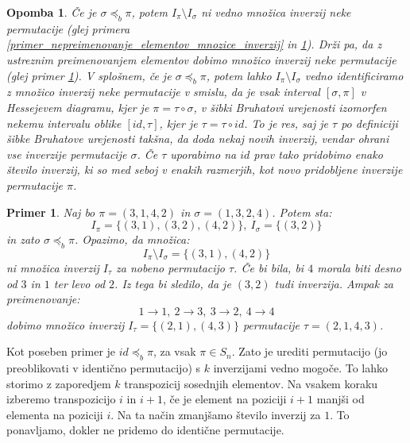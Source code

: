 \documentclass[a4paper, 12pt]{book}
\newtheorem{primer}{Primer}[chapter]
\newtheorem{opomba}{Opomba}[chapter]
\begin{document}
\begin{opomba}
    Če je $\sigma \preceq_b \pi$, potem $I_{\pi} \setminus I_{\sigma}$ ni vedno množica inverzij neke permutacije (glej primera \ref{primer_nepreimenovanje_elementov_mnozice_inverzij} in \ref{primer_preimenovanje_elementov_mnozice_inverzij}). Drži pa, da z ustreznim preimenovanjem elementov dobimo množico inverzij neke permutacije (glej primer \ref{primer_preimenovanje_elementov_mnozice_inverzij}). V splošnem, če je $\sigma \preceq_b \pi$, potem lahko $I_{\pi} \setminus I_{\sigma}$ vedno identificiramo z množico inverzij neke permutacije v smislu, da je vsak interval $[\sigma, \pi]$ v Hessejevem diagramu, kjer je $\pi = \tau \circ \sigma$, v šibki Bruhatovi urejenosti izomorfen nekemu intervalu oblike $[id, \tau]$, kjer je $\tau = \tau \circ id$. To je res, saj je $\tau$ po definiciji šibke Bruhatove urejenosti takšna, da doda nekaj novih inverzij, vendar ohrani vse inverzije permutacije $\sigma$. Če $\tau$ uporabimo na $id$ prav tako pridobimo enako število inverzij, ki so med seboj v enakih razmerjih, kot novo pridobljene inverzije permutacije $\pi$.
\end{opomba}

\begin{primer}
\label{primer_preimenovanje_elementov_mnozice_inverzij}
    Naj bo $\pi = (3, 1, 4, 2)$ in $\sigma = (1, 3, 2, 4)$. Potem sta:
    \[I_{\pi} = \{ (3, 1), (3, 2), (4, 2) \}, \ I_{\sigma} = \{ (3, 2) \}\]
    in zato $\sigma \preceq_b \pi$. Opazimo, da množica:
    \[
        I_{\pi} \setminus I_{\sigma} = \{ (3, 1), (4, 2) \}
    \]
    ni množica inverzij $I_{\tau}$ za nobeno permutacijo $\tau$. Če bi bila, bi $4$ morala biti desno od $3$ in $1$ ter levo od $2$. Iz tega bi sledilo, da je $(3, 2)$ tudi inverzija. Ampak za preimenovanje:
    \[
        1 \rightarrow 1, \ 2 \rightarrow 3, \ 3 \rightarrow 2, \ 4 \rightarrow 4 
    \]
    dobimo množico inverzij $I_{\tau} = \{ (2, 1), (4, 3)\}$ permutacije $\tau = (2, 1, 4, 3)$.
\end{primer}

Kot poseben primer je $id \preceq_b \pi$, za vsak $\pi \in S_n$. Zato je urediti permutacijo (jo preoblikovati v identično permutacijo) s $k$ inverzijami vedno mogoče. To lahko storimo z zaporedjem $k$ transpozicij sosednjih elementov. Na vsakem koraku izberemo transpozicijo $i$ in $i+1$, če je element na poziciji $i+1$ manjši od elementa na poziciji $i$. Na ta način zmanjšamo število inverzij za $1$. To ponavljamo, dokler ne pridemo do identične permutacije.
\end{document}
